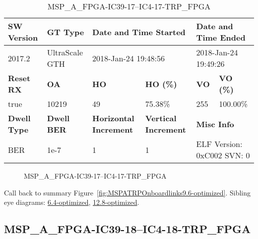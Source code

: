 \begin{table}[h]
\centering
\caption{MSP\_A\_FPGA-IC39-17--IC4-17-TRP\_FPGA}
\label{tab:MSPAFPGAIC3917IC417TRPFPGA9.6-optimized}
\begin{tabular}{@{}|l|l|l|l|l|l|@{}}
\toprule
\textbf{SW Version}                & \textbf{GT Type}   & \multicolumn{2}{l|}{\textbf{Date and Time Started}}            & \multicolumn{2}{l|}{\textbf{Date and Time Ended}}        \\ \midrule
2017.2                       & UltraScale GTH          & \multicolumn{2}{l|}{2018-Jan-24 19:48:56}                   & \multicolumn{2}{l|}{2018-Jan-24 19:49:26}               \\ \midrule
\textbf{Reset RX}                  & \textbf{OA} & \textbf{HO}   & \textbf{HO (\%)} & \textbf{VO} & \textbf{VO (\%)} \\ \midrule
true & 10219        & 49          & 75.38\%        & 255        & 100.00\%       \\ \midrule
\textbf{Dwell Type}                & \textbf{Dwell BER} & \textbf{Horizontal Increment} & \textbf{Vertical Increment}    & \multicolumn{2}{l|}{\textbf{Misc Info}}                  \\ \midrule
BER                            & 1e-7        & 1        & 1           & \multicolumn{2}{l|}{ELF Version: 0xC002 SVN: 0}                         \\ \bottomrule
\end{tabular}
\end{table}

\begin{figure}[h]
\caption{MSP\_A\_FPGA-IC39-17--IC4-17-TRP\_FPGA} \label{fig:MSPAFPGAIC3917IC417TRPFPGA9.6-optimized}
\end{figure}

Call back to summary Figure~\ref{fig:MSPATRPOnboardlinks9.6-optimized}.
Sibling eye diagrams: \hyperref[sec:MSPAFPGAIC3917IC417TRPFPGA6.4-optimized]{6.4-optimized}, \hyperref[sec:MSPAFPGAIC3917IC417TRPFPGA12.8-optimized]{12.8-optimized}.

\clearpage
\newpage


\subsection{MSP\_A\_FPGA-IC39-18--IC4-18-TRP\_FPGA}\label{sec:MSPAFPGAIC3918IC418TRPFPGA9.6-optimized}

